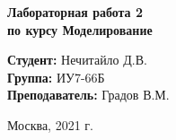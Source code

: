 \documentclass[a4paper, 14pt]{extreport}
\begin{document}
 	\vspace*{20mm}
 	
 	\LARGE
 	\begin{center}
 		\textbf{Лабораторная работа 2} \\
 		\textbf{по курсу Моделирование}
 	\end{center}
 	
 	\vspace*{30mm}
 	
 	\large
 	\begin{flushleft}
 		\textbf{Студент:} Нечитайло Д.В. \\
 		\textbf{Группа:} ИУ7-66Б \\
 		\textbf{Преподаватель:} Градов В.М. \\
 	\end{flushleft}
 	
 	\vspace*{30mm}
 	
 	\large
 	\begin{center}
 		Москва, 2021 г.
 	\end{center}
 	
 	\thispagestyle{empty}
 	
 	\newpage
 	
 	
    
    
\end{document}

